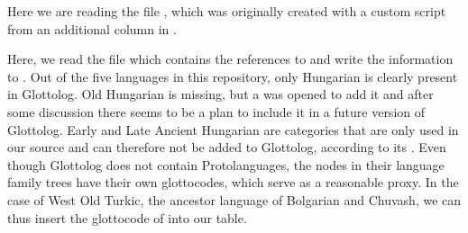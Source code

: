 \documentclass[letterpaper,10pt,english]{sphinxmanual}
\begin{document}
{{{{\begin{sphinxVerbatim}[commandchars=\\\{\}]
  
     
  \PYG{p}{[}\PYG{p}{]} \PYG{p}{[}\PYG{p}{]}    
\end{sphinxVerbatim}

\sphinxAtStartPar
Here we are reading the file , which was originally
created with a custom script from an additional column in .

\begin{sphinxVerbatim}[commandchars=\\\{\}]
  
\end{sphinxVerbatim}

\sphinxAtStartPar
Here, we read the file  which contains the references to
 and write the information to
. Out of the five languages in this repository, only
Hungarian is clearly present in Glottolog. Old Hungarian is missing, but a
 was opened to
add it and after some discussion there seems to be a plan to include it in a
future version of Glottolog. Early and Late Ancient Hungarian are categories
that are only used in our source and can therefore not be added to Glottolog,
according to its . Even
though Glottolog does not contain Proto\sphinxhyphen{}languages, the nodes in their
language
family trees have their own glotto\sphinxhyphen{}codes, which serve as a reasonable proxy.
In the case of West Old Turkic, the ancestor language of Bolgarian and Chuvash,
we can thus insert the glotto\sphinxhyphen{}code of  into our table.

}}}}
\end{document}
